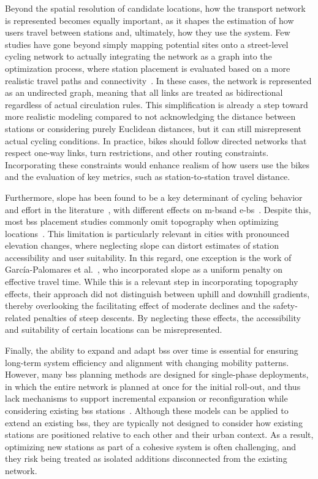 Beyond the spatial resolution of candidate locations, how the transport network is represented becomes equally important, as it shapes the estimation of how users travel between stations and, ultimately, how they use the system. Few studies have gone beyond simply mapping potential sites onto a street-level cycling network to actually integrating the network as a graph into the optimization process, where station placement is evaluated based on a more realistic travel paths and connectivity~\cite{Cintrano2018, Xin2013}. In these cases, the network is represented as an undirected graph, meaning that all links are treated as bidirectional regardless of actual circulation rules. This simplification is already a step toward more realistic modeling compared to not acknowledging the distance between stations or considering purely Euclidean distances, but it can still misrepresent actual cycling conditions. In practice, bikes should follow directed networks that respect one-way links, turn restrictions, and other routing constraints. Incorporating these constraints would enhance realism of how users use the bikes and the evaluation of key metrics, such as station-to-station travel distance.

Furthermore, slope has been found to be a key determinant of cycling behavior and effort in the literature~\cite{Grau-Escolano2024, MateoBabiano2016}, with different effects on \acp{m-b}and \acp{e-b}~\cite{Grau-Escolano2024}. Despite this, most \ac{bss} placement studies commonly omit topography when optimizing locations~\cite{Fazio2021, Kabak2018, Ebrahimi2022, Tera2023}. This limitation is particularly relevant in cities with pronounced elevation changes, where neglecting slope can distort estimates of station accessibility and user suitability. In this regard, one exception is the work of García-Palomares et al.~\cite{GarciaPalomares2012}, who incorporated slope as a uniform penalty on effective travel time. While this is a relevant step in incorporating topography effects, their approach did not distinguish between uphill and downhill gradients, thereby overlooking the facilitating effect of moderate declines and the safety-related penalties of steep descents. By neglecting these effects, the accessibility and suitability of certain locations can be misrepresented.

Finally, the ability to expand and adapt \ac{bss} over time is essential for ensuring long-term system efficiency and alignment with changing mobility patterns. However, many \ac{bss} planning methods are designed for single-phase deployments, in which the entire network is planned at once for the initial roll-out, and thus lack mechanisms to support incremental expansion or reconfiguration while considering existing \ac{bss} stations~\cite{Kabak2018, Bahadori2022, Duran-Rodas2021}. Although these models can be applied to extend an existing \ac{bss}, they are typically not designed to consider how existing stations are positioned relative to each other and their urban context. As a result, optimizing new stations as part of a cohesive system is often challenging, and they risk being treated as isolated additions disconnected from the existing network.

